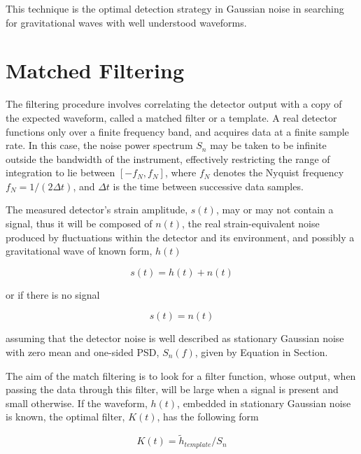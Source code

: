 \documentclass[binding=0.6cm, LaM]{sapthesis}
\begin{document}
	This technique is the optimal detection strategy in Gaussian noise 
	in searching for gravitational waves with well understood waveforms. \cite[p. 2] {bar} \cite[p. 2] {bar}


\section{Matched Filtering}

	The filtering procedure involves correlating the detector output 
	with a copy of the expected waveform, 
	called a matched filter or a template.
	A real detector functions only over a finite frequency band, 
	and acquires data at a finite sample rate. 
	In this case, the noise power spectrum $S_n$ 
	may be taken to be infinite outside the bandwidth of the instrument, 
	effectively restricting the range of integration to lie between $[-f_N, f_N]$, 
	where $f_N$ denotes the Nyquist frequency $f_N = 1/(2\Delta t)$, 
	and $\Delta t$ is the time between successive data samples.   \cite[p. 2] {bar}

	The measured detector’s strain amplitude, $s(t)$, may or may not contain a signal,
	thus it will be composed of $n(t)$, the real strain-equivalent noise
        produced by fluctuations within the detector and its environment, 
	and possibly a gravitational wave of known form, $h(t)$
        
                \begin{equation}
                        s(t) = h(t) + n(t)
                \end{equation}
	
	or if there is no signal   		

		\begin{equation}
                        s(t) = n(t)
                \end{equation}
	
        assuming that the detector noise is well described as stationary Gaussian noise with zero mean and one-sided PSD, $S_n(f)$, given by Equation in Section.

        The aim of the match filtering is to look for a filter function,
	whose output, when passing the data through this filter, 
	will be large when a signal is present and small otherwise. 
        If the waveform, $h(t)$, embedded in stationary Gaussian noise is known, 
        the optimal filter, $K(t)$, has the following form

		\begin{equation}
 			K(t) = \tilde h_{template}/S_n
		\end{equation}
\end{document}
